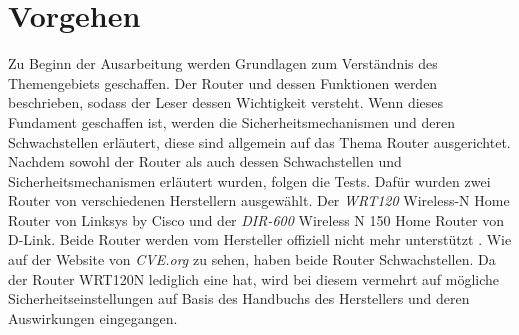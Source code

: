 	\section{Vorgehen}
	Zu Beginn der Ausarbeitung werden Grundlagen zum Verständnis des Themengebiets
	geschaffen. Der Router und dessen Funktionen werden beschrieben, sodass der
	Leser dessen Wichtigkeit versteht. Wenn dieses Fundament geschaffen ist,
	werden die Sicherheitsmechanismen und deren Schwachstellen erläutert, diese
	sind allgemein auf das Thema Router ausgerichtet. Nachdem sowohl der Router
	als auch dessen Schwachstellen und Sicherheitsmechanismen erläutert wurden,
	folgen die Tests. Dafür wurden zwei Router von verschiedenen Herstellern
	ausgewählt. Der \emph{WRT120} Wireless-N Home Router von Linksys by Cisco 
	und der \emph{DIR-600} Wireless N 150 Home Router von D-Link. Beide Router
	werden vom Hersteller offiziell nicht mehr unterstützt 
	\cite{linksysproductend, dlinktechnicalsupport}.
	Wie auf der Website von \emph{CVE.org} zu sehen, haben beide Router Schwachstellen. 
	Da der Router WRT120N lediglich eine hat, wird bei diesem
	vermehrt auf mögliche Sicherheitseinstellungen auf Basis des Handbuchs des
	Herstellers und deren Auswirkungen eingegangen.
	
